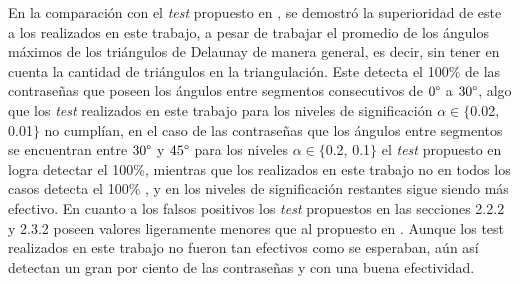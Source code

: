 \documentclass[12pt]{report}
\begin{document}
En la comparación con el \textit{test} propuesto en \cite{13}, se demostró la superioridad de este  a los realizados en este trabajo, a pesar de trabajar el promedio de los ángulos máximos de los triángulos de Delaunay de manera general, es decir, sin tener en cuenta la cantidad de triángulos en  la triangulación. Este detecta el 100\% de las contraseñas que poseen los ángulos entre segmentos consecutivos de $0\degree$ a $30\degree$, algo que los \textit{test} realizados en este trabajo para los niveles de significación $\alpha \in \{$0.02, 0.01$\}$ no cumplían, en el caso de las contraseñas que los ángulos entre segmentos se encuentran entre $30\degree$ y $45\degree$ para los niveles $\alpha \in \{$0.2, 0.1$\}$ el \textit{test} propuesto en \cite{13} logra detectar el 100\%, mientras que los realizados en este trabajo no en todos los casos detecta el 100\% , y en los niveles de significación restantes sigue siendo más efectivo. En cuanto a los falsos positivos los \textit{test} propuestos en las secciones 2.2.2 y 2.3.2 poseen valores ligeramente menores que al propuesto en \cite{13}. Aunque los test realizados en este trabajo no fueron tan efectivos como se esperaban, aún así detectan un gran por ciento de las contraseñas y con una buena efectividad.
\end{document}

